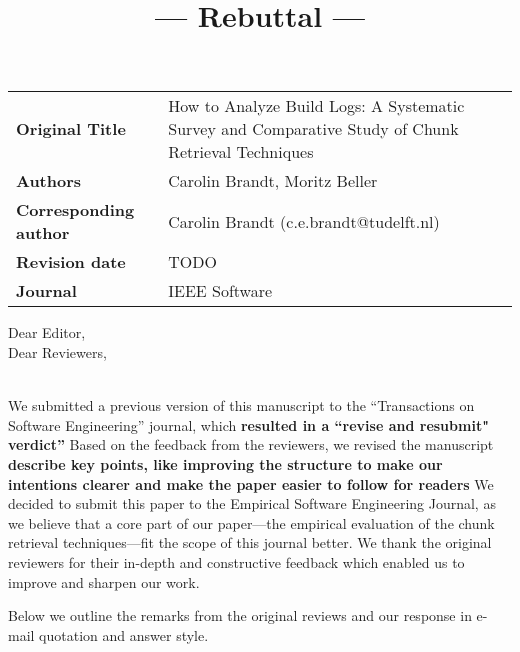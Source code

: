 \documentclass[10pt,a4wide]{article}
\newcommand{\todo}[1] {{\bfseries \color{todo} #1}}
\begin{document}
\title{\textbf {--- Rebuttal ---}}

\date{}
\maketitle

\vspace{-1cm}

\begin{tabular}{|lp{11cm}|}
\hline
\textbf{Original Title} & 
How to Analyze Build Logs: A Systematic Survey and Comparative Study of Chunk Retrieval Techniques \\
\textbf{Authors} & Carolin Brandt, Moritz Beller\\
\textbf{Corresponding author} & Carolin Brandt (c.e.brandt@tudelft.nl)\\
\textbf{Revision date} & TODO \\ %
\textbf{Journal} & IEEE Software \\
\hline
\end{tabular}
\vspace{1cm}

\noindent
Dear Editor,\\
Dear Reviewers,
\\\\
\noindent

We submitted a previous version of this manuscript to the ``Transactions on Software Engineering'' journal,
which \todo{resulted in a ``revise and resubmit" verdict''}
Based on the feedback from the reviewers, we revised the manuscript 
\todo{describe key points, like improving the structure to make our intentions clearer and make the paper easier to follow for readers}
We decided to submit this paper to the Empirical Software Engineering Journal,
as we believe that a core part of our paper---the empirical evaluation of the
chunk retrieval techniques---fit the scope of this journal better.
We thank the original reviewers for their in-depth and constructive feedback
which enabled us to improve and sharpen our work.

\noindent
Below we outline the remarks from the original reviews and our response
in e-mail quotation and answer style.

\end{document}
